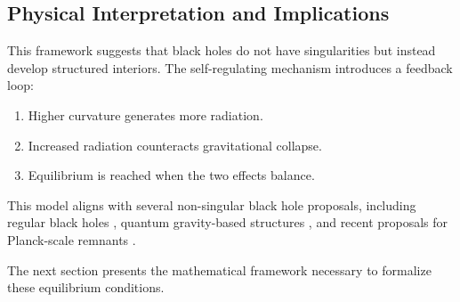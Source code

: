 \subsection{Physical Interpretation and Implications}
This framework suggests that black holes do not have singularities but instead develop structured interiors. The self-regulating mechanism introduces a feedback loop:
\begin{enumerate}
    \item Higher curvature generates more radiation.
    \item Increased radiation counteracts gravitational collapse.
    \item Equilibrium is reached when the two effects balance.
\end{enumerate}

This model aligns with several non-singular black hole proposals, including regular black holes \cite{bardeen1968non, hayward2006formation}, quantum gravity-based structures \cite{bojowald2005nonsingular, rovelli1996black}, and recent proposals for Planck-scale remnants \cite{brustein2018black}. 

The next section presents the mathematical framework necessary to formalize these equilibrium conditions.
